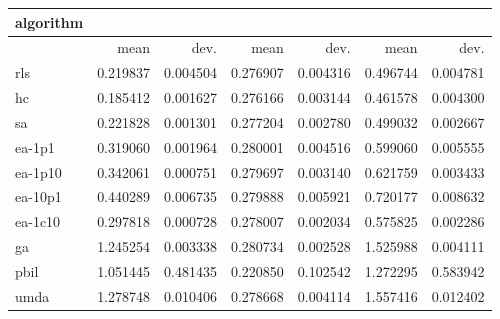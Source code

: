\begin{tabular}{@{}l*{6}{>{{}}N{1}{2}}@{}}
\toprule
{algorithm} &  &  &  \\
\midrule
& {mean} & {dev.} & {mean} & {dev.} & {mean} & {dev.} \\
\midrule
rls & 0.219837 & 0.004504 & 0.276907 & 0.004316 & 0.496744 & 0.004781 \\
 hc & 0.185412 & 0.001627 & 0.276166 & 0.003144 & 0.461578 & 0.004300 \\
 sa & 0.221828 & 0.001301 & 0.277204 & 0.002780 & 0.499032 & 0.002667 \\
 ea-1p1 & 0.319060 & 0.001964 & 0.280001 & 0.004516 & 0.599060 & 0.005555 \\
 ea-1p10 & 0.342061 & 0.000751 & 0.279697 & 0.003140 & 0.621759 & 0.003433 \\
 ea-10p1 & 0.440289 & 0.006735 & 0.279888 & 0.005921 & 0.720177 & 0.008632 \\
 ea-1c10 & 0.297818 & 0.000728 & 0.278007 & 0.002034 & 0.575825 & 0.002286 \\
 ga & 1.245254 & 0.003338 & 0.280734 & 0.002528 & 1.525988 & 0.004111 \\
 pbil & 1.051445 & 0.481435 & 0.220850 & 0.102542 & 1.272295 & 0.583942 \\
 umda & 1.278748 & 0.010406 & 0.278668 & 0.004114 & 1.557416 & 0.012402 \\
 \bottomrule
\end{tabular}
